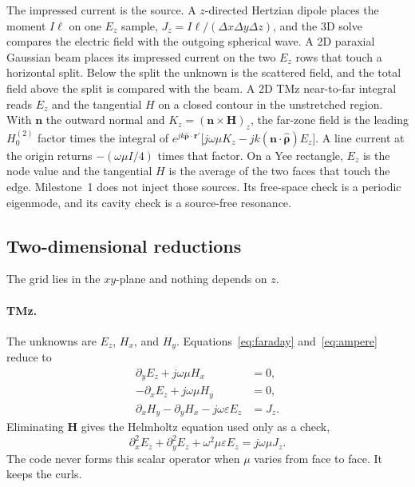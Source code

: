 \documentclass[11pt,a4paper]{article}
\numberwithin{equation}{section}
\begin{document}
The impressed current is the source. A $z$-directed Hertzian dipole places
the moment $I\ell$ on one $E_z$ sample,
$J_z=I\ell/(\Delta x\Delta y\Delta z)$, and the 3D solve compares the
electric field with the outgoing spherical wave. A 2D paraxial Gaussian
beam places its impressed current on the two $E_z$ rows that touch a
horizontal split. Below the split the unknown is the scattered field, and
the total field above the split is compared with the beam. A 2D TMz
near-to-far integral reads $E_z$ and the tangential $H$ on a closed
contour in the unstretched region. With $\mathbf{n}$ the outward normal
and $K_z=(\mathbf{n}\times\mathbf{H})_z$, the far-zone field is the
leading $H_0^{(2)}$ factor times the integral of
$e^{jk\hat{\boldsymbol{\rho}}\cdot\mathbf{r}'}
\bigl[j\omega\mu K_z-jk(\mathbf{n}\cdot\hat{\boldsymbol{\rho}})E_z\bigr]$.
A line current at the origin returns $-(\omega\mu I/4)$ times that
factor. On a Yee rectangle, $E_z$ is the node value and the tangential
$H$ is the average of the two faces that touch the edge. Milestone~1
does not inject those sources. Its free-space check is a periodic
eigenmode, and its cavity check is a source-free resonance.

\subsection{Two-dimensional reductions}
\label{sec:polarizations}

The grid lies in the $xy$-plane and nothing depends on $z$.

\paragraph{TMz.}
The unknowns are $E_z$, $H_x$, and $H_y$. Equations~\eqref{eq:faraday}
and~\eqref{eq:ampere} reduce to
\begin{align}
\partial_y E_z + j\omega\mu H_x &= 0, \label{eq:tm-hx}\\
-\partial_x E_z + j\omega\mu H_y &= 0, \label{eq:tm-hy}\\
\partial_x H_y - \partial_y H_x - j\omega\varepsilon E_z &= J_z. \label{eq:tm-ez}
\end{align}
Eliminating $\mathbf{H}$ gives the Helmholtz equation used only as a check,
\begin{equation}
\partial_x^2 E_z + \partial_y^2 E_z + \omega^2\mu\varepsilon E_z = j\omega\mu J_z.
\label{eq:helmholtz-tm}
\end{equation}
The code never forms this scalar operator when $\mu$ varies from face to face.
It keeps the curls.
\end{document}
